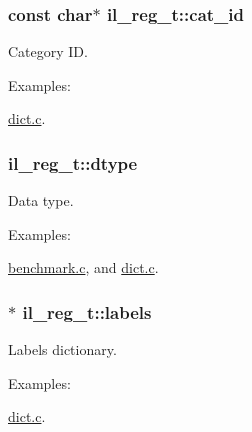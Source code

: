 \subsubsection[{\texorpdfstring{cat\+\_\+id}{cat_id}}]{\setlength{\rightskip}{0pt plus 5cm}const char$\ast$ il\+\_\+reg\+\_\+t\+::cat\+\_\+id}\hypertarget{structil__reg__t_a9306d321ecedb9559d7dd339c6115b78}{}\label{structil__reg__t_a9306d321ecedb9559d7dd339c6115b78}


Category ID. 

\begin{Desc}
\item[Examples\+: ]\par
\hyperlink{dict_8c-example}{dict.\+c}.\end{Desc}
\subsubsection[{\texorpdfstring{dtype}{dtype}}]{ il\+\_\+reg\+\_\+t\+::dtype}\hypertarget{structil__reg__t_a1780caa197277828816c7214aa7b5d2f}{}\label{structil__reg__t_a1780caa197277828816c7214aa7b5d2f}


Data type. 

\begin{Desc}
\item[Examples\+: ]\par
\hyperlink{benchmark_8c-example}{benchmark.\+c}, and \hyperlink{dict_8c-example}{dict.\+c}.\end{Desc}
\subsubsection[{\texorpdfstring{labels}{labels}}]{$\ast$ il\+\_\+reg\+\_\+t\+::labels}\hypertarget{structil__reg__t_a6d86137472a9c21c1c364f05c58b943b}{}\label{structil__reg__t_a6d86137472a9c21c1c364f05c58b943b}


Labels dictionary. 

\begin{Desc}
\item[Examples\+: ]\par
\hyperlink{dict_8c-example}{dict.\+c}.\end{Desc}
